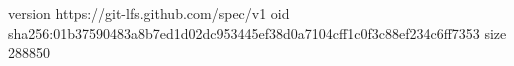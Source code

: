 version https://git-lfs.github.com/spec/v1
oid sha256:01b37590483a8b7ed1d02dc953445ef38d0a7104cff1c0f3c88ef234c6ff7353
size 288850
